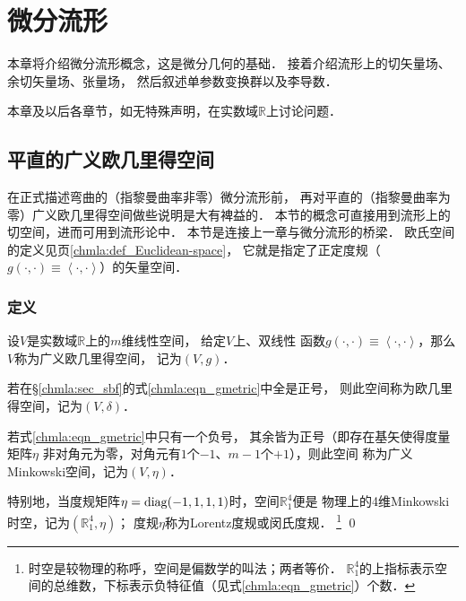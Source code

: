 
\chapter{微分流形}\label{chdm}
本章将介绍微分流形概念，这是微分几何的基础．
接着介绍流形上的切矢量场、余切矢量场、张量场，
然后叙述单参数变换群以及李导数．


本章及以后各章节，如无特殊声明，在实数域$\mathbb{R}$上讨论问题．


\section{平直的广义欧几里得空间}\label{chdm:sec_Euclidean-space}
在正式描述弯曲的（指黎曼曲率非零）微分流形前，
再对平直的（指黎曼曲率为零）广义欧几里得空间做些说明是大有裨益的．
本节的概念可直接用到流形上的切空间，进而可用到流形论中．
本节是连接上一章与微分流形的桥梁．
欧氏空间的定义见\pageref{chmla:def_Euclidean-space}页\ref{chmla:def_Euclidean-space}，
它就是指定了正定度规（$g(\cdot,\cdot)\equiv \left<\cdot,\cdot\right>$）的矢量空间．


\subsection{定义}\label{chdm:sec_gen-Euclidean-space}

\begin{definition}\label{chdm:def_MinkowskiSpace}
    设$V$是实数域$\mathbb{R}$上的$m$维线性空间，
    给定$V$上{、}双线性
    函数$g(\cdot,\cdot)\equiv \left<\cdot,\cdot\right>$，那么$V$称为{\heiti 广义欧几里得空间}，
    记为$(V,g)$．
    
    若在\S \ref{chmla:sec_sbf}的式\eqref{chmla:eqn_gmetric}中全是正号，
    则此空间称为{\heiti 欧几里得空间}，记为$(V,\delta)$．
    
    若式\eqref{chmla:eqn_gmetric}中只有一个负号，
    其余皆为正号（即存在基矢使得度量矩阵$\eta$
    非对角元为零，对角元有$1$个$-1$、$m-1$个$+1$），则此空间
    称为广义{\heiti Minkowski空间}，记为$(V,\eta)$．
    
    特别地，当度规矩阵$\eta = {\rm diag}(-1,1,1,1)$时，空间$\mathbb{R}^4_1$便是
    物理上的4维{\heiti Minkowski时空}，记为$(\mathbb{R}^4_1,\eta)$；
    度规$\eta$称为{\heiti Lorentz度规}或闵氏度规．  
    {\footnote{{\kaishu 时空}是较物理的称呼，{\kaishu 空间}是偏数学的叫法；两者等价．
    $\mathbb{R}^4_1$的上指标表示空间的总维数，下标表示负特征值（见式\eqref{chmla:eqn_gmetric}）个数．}}
    \qed
    
    
     
     
     
\end{definition}


